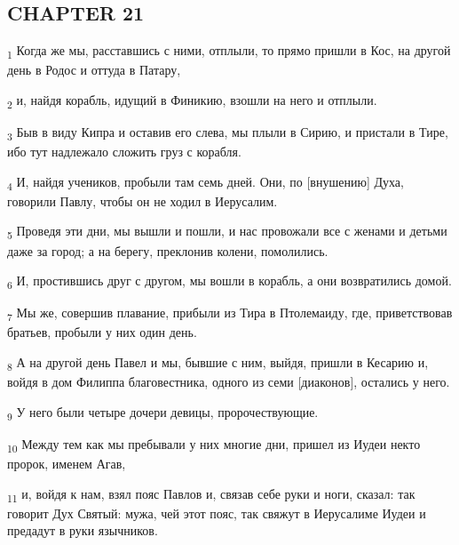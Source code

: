 \subsection{CHAPTER 21}
\begin{tcolorbox}
\textsubscript{1} Когда же мы, расставшись с ними, отплыли, то прямо пришли в Кос, на другой день в Родос и оттуда в Патару,
\end{tcolorbox}
\begin{tcolorbox}
\textsubscript{2} и, найдя корабль, идущий в Финикию, взошли на него и отплыли.
\end{tcolorbox}
\begin{tcolorbox}
\textsubscript{3} Быв в виду Кипра и оставив его слева, мы плыли в Сирию, и пристали в Тире, ибо тут надлежало сложить груз с корабля.
\end{tcolorbox}
\begin{tcolorbox}
\textsubscript{4} И, найдя учеников, пробыли там семь дней. Они, по [внушению] Духа, говорили Павлу, чтобы он не ходил в Иерусалим.
\end{tcolorbox}
\begin{tcolorbox}
\textsubscript{5} Проведя эти дни, мы вышли и пошли, и нас провожали все с женами и детьми даже за город; а на берегу, преклонив колени, помолились.
\end{tcolorbox}
\begin{tcolorbox}
\textsubscript{6} И, простившись друг с другом, мы вошли в корабль, а они возвратились домой.
\end{tcolorbox}
\begin{tcolorbox}
\textsubscript{7} Мы же, совершив плавание, прибыли из Тира в Птолемаиду, где, приветствовав братьев, пробыли у них один день.
\end{tcolorbox}
\begin{tcolorbox}
\textsubscript{8} А на другой день Павел и мы, бывшие с ним, выйдя, пришли в Кесарию и, войдя в дом Филиппа благовестника, одного из семи [диаконов], остались у него.
\end{tcolorbox}
\begin{tcolorbox}
\textsubscript{9} У него были четыре дочери девицы, пророчествующие.
\end{tcolorbox}
\begin{tcolorbox}
\textsubscript{10} Между тем как мы пребывали у них многие дни, пришел из Иудеи некто пророк, именем Агав,
\end{tcolorbox}
\begin{tcolorbox}
\textsubscript{11} и, войдя к нам, взял пояс Павлов и, связав себе руки и ноги, сказал: так говорит Дух Святый: мужа, чей этот пояс, так свяжут в Иерусалиме Иудеи и предадут в руки язычников.
\end{tcolorbox}
